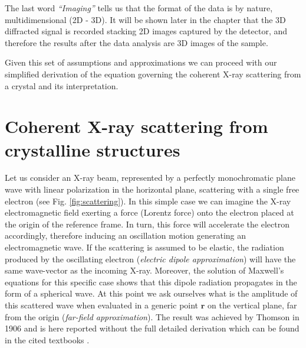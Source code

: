 \begin{itemize}

\end{itemize}

The last word \textit{``Imaging''} tells us that the format of the data is by nature, multidimensional (2D - 3D). It 
will be shown later in the chapter that the 3D diffracted signal is recorded stacking 2D images captured by the detector, 
and therefore the results after the data analysis are 3D images of the sample.

Given this set of assumptions and approximations we can proceed with our simplified derivation of the equation governing 
the coherent X-ray scattering from a crystal and its interpretation. 

\section{Coherent X-ray scattering from crystalline structures}

Let us consider an X-ray beam, represented by a perfectly monochromatic plane wave with linear polarization in the horizontal 
plane, scattering with a single free electron (see Fig. \ref{fig:scattering}). In this simple case we can imagine the 
X-ray electromagnetic field exerting a force (Lorentz force) onto the electron placed at the origin of the reference frame. In turn, 
this force will accelerate the electron accordingly, therefore inducing an oscillation motion generating
an electromagnetic wave. If the scattering is assumed to be elastic, the radiation 
produced by the oscillating electron (\textit{electric dipole approximation}) will have the same wave-vector as the incoming X-ray. 
Moreover, the solution of Maxwell's equations for this specific case 
shows that this dipole radiation propagates in the form of a spherical wave. At this point we ask ourselves what is the amplitude 
of this scattered wave when evaluated in a generic point $\mathbf r$ on the vertical plane, far from the origin (\textit{far-field approximation}). 
The result was achieved by Thomson in 1906 and is here reported without the full detailed derivation which can be found in the 
cited textbooks \cite{alsnielsen_mcmorrow2011,ashcroft_mermin1976, guinier1994}. 


